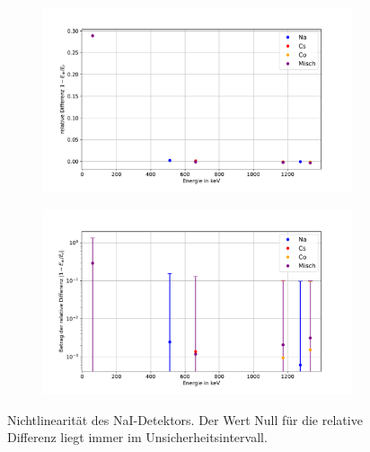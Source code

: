 \documentclass[
	a4paper,
	12pt,
	pagesize,
	ngerman
]{scrartcl}
\begin{document}
\begin{figure}[H]
		\centering
		\begin{subfigure}[t]{0.8\textwidth}
			\centering
			\includegraphics[width= \linewidth]{img/diff_na.pdf}
		\end{subfigure}
		\begin{subfigure}[t]{0.8\textwidth}
			\centering
			\includegraphics[width=\linewidth]{img/diff_na_log.pdf}
		\end{subfigure}
		\caption{Nichtlinearität des NaI-Detektors.
		Der Wert Null für die relative Differenz liegt immer im Unsicherheitsintervall.
		}
		\label{fg_diff_na}
	\end{figure}
\end{document}
